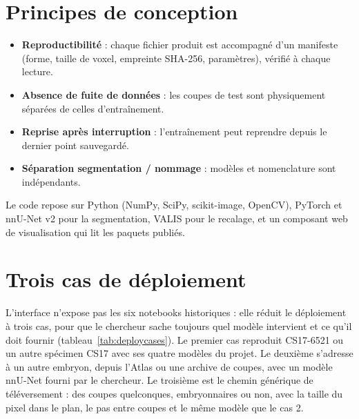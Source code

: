 \documentclass[12pt,a4paper]{report}
\begin{document}
\section{Principes de conception}

\begin{itemize}
    \item \textbf{Reproductibilité} : chaque fichier produit est accompagné d'un manifeste (forme, taille de voxel, empreinte SHA-256, paramètres), vérifié à chaque lecture.
    \item \textbf{Absence de fuite de données} : les coupes de test sont physiquement séparées de celles d'entraînement.
    \item \textbf{Reprise après interruption} : l'entraînement peut reprendre depuis le dernier point sauvegardé.
    \item \textbf{Séparation segmentation / nommage} : modèles et nomenclature sont indépendants.
\end{itemize}
Le code repose sur Python (NumPy, SciPy, scikit-image, OpenCV), PyTorch et nnU-Net v2 pour la segmentation, VALIS pour le recalage, et un composant web de visualisation qui lit les paquets publiés.

\section{Trois cas de déploiement}

L'interface n'expose pas les six notebooks historiques : elle réduit le déploiement à trois cas, pour que le chercheur sache toujours quel modèle intervient et ce qu'il doit fournir (tableau~\ref{tab:deploycases}). Le premier cas reproduit CS17-6521 ou un autre spécimen CS17 avec ses quatre modèles du projet. Le deuxième s'adresse à un autre embryon, depuis l'Atlas ou une archive de coupes, avec un modèle nnU-Net fourni par le chercheur. Le troisième est le chemin générique de téléversement : des coupes quelconques, embryonnaires ou non, avec la taille du pixel dans le plan, le pas entre coupes et le même modèle que le cas 2.
\end{document}
